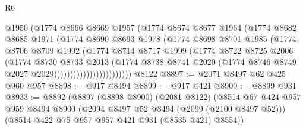 \begin{lexlean}{R6}
\begin{coremodule}
                              @1950
                              (@1774
                                @8666
                                @8669
                                @1957
                                (@1774
                                  @8674
                                  @8677
                                  @1964
                                  (@1774
                                    @8682
                                    @8685
                                    @1971
                                    (@1774
                                      @8690
                                      @8693
                                      @1978
                                      (@1774
                                        @8698
                                        @8701
                                        @1985
                                        (@1774
                                          @8706
                                          @8709
                                          @1992
                                          (@1774
                                            @8714
                                            @8717
                                            @1999
                                            (@1774
                                              @8722
                                              @8725
                                              @2006
                                              (@1774
                                                @8730
                                                @8733
                                                @2013
                                                (@1774
                                                  @8738
                                                  @8741
                                                  @2020
                                                  (@1774
                                                    @8746
                                                    @8749
                                                    @2027
                                                    @2029))))))))))))))))))))))))
    @8122
@8897 := @2071 @8497 @62 @425 @960 @957
@8898 := @917 @8494
@8899 := @917 @421
@8900 := @8899 @931
@8933 := @8892
    (@8897
      (@8898 @8900)
      (@2081 @8122)
      (@8514
        @67
        @424
        @957
        @959
        @8494
        @8900
        (@2094 @8497 @52 @8494 (@2099 (@2100 @8497 @52)))
        (@8514 @422 @75 @957 @957 @421 @931 (@8535 @421) @8554))

\end{coremodule}
\end{lexlean}
